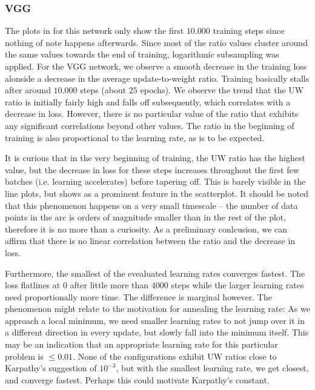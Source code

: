 \subsubsection*{VGG}

The plots in for this network only show the first $10.000$ training steps since
nothing of note happens afterwards. Since most of the ratio values cluster
around the same values towards the end of training, logarithmic subsampling was
applied.  For the VGG network, we observe a smooth decrease in the training loss
alonside a decrease in the average update-to-weight ratio. Training basically
stalls after around $10.000$ steps (about $25$ epochs).  We observe the trend
that the UW ratio is initially fairly high and falls off subsequently, which
correlates with a decrease in loss. However, there is no particular value of the
ratio that exhibits any significant correlations beyond other values. The
ratio in the beginning of training is also proportional to the learning rate, as
is to be expected.

It is curious that in the very beginning of training, the UW ratio has the
highest value, but the decrease in loss for these steps increases throughout the
first few batches (i.e. learning accelerates) before tapering off. This is
barely visible in the line plots, but shows as a prominent feature in the
scatterplot. It should be noted that this phenomenon happens on a very small
timescale -- the number of data points in the arc is orders of magnitude smaller
than in the rest of the plot, therefore it is no more than a curiosity. As a
preliminary conlcusion, we can affirm that there is no linear correlation
between the ratio and the decrease in loss.

Furthermore, the smallest of the evealuated learning rates converges fastest.
The loss flatlines at $0$ after little more than $4000$ steps while the larger
learning rates need proportionally more time. The difference is marginal
however. The phenomenon might relate to the motivation for annealing the
learning rate: As we approach a local minimum, we need smaller learning rates to
not jump over it in a different direction in every update, but slowly fall into
the minimum itself. This may be an indication that an appropriate learning rate
for this particular problem is $\le 0.01$. None of the configurations exhibit UW
ratios close to Karpathy's suggestion of $10^{-3}$, but with the smallest
learning rate, we get closest, and converge fastest. Perhaps this could motivate
Karpathy's constant.

